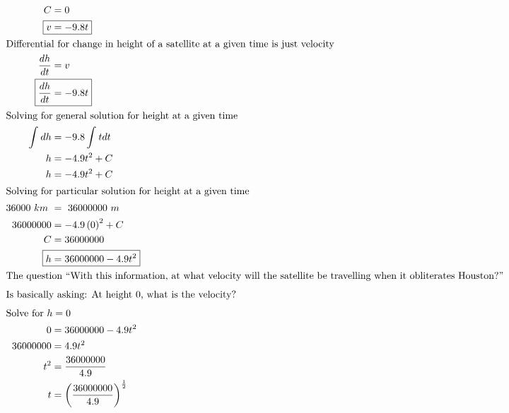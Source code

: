 \documentclass[12pt]{article}
\begin{document}
\begin{align}
  C                       & =0                                                                             \\
  \Aboxed{v               & =-9.8t}                                                                        \\
  \intertext{Differential for change in height of a satellite at a given time is just velocity}
  \frac{dh}{dt}           & =v                                                                             \\
  \Aboxed{\frac{dh}{dt}   & =-9.8t}                                                                        \\
  \intertext{Solving for general solution for height at a given time}
  \int_{ }^{ }dh          & =-9.8\int_{ }^{ }tdt                                                           \\
  h                       & =-4.9t^{2}+C                                                                   \\
  h                       & =-4.9t^{2}+C                                                                   \\
  \intertext{Solving for particular solution for height at a given time}
  36000\ km\              & =\ 36000000\ m                                                                 \\
  36000000                & =-4.9\left(0\right)^{2}+C                                                      \\
  C                       & =36000000                                                                      \\
  \Aboxed{h               & =36000000-4.9t^{2}}                                                            \\
  \intertext{The question ``With this information, at what velocity will the satellite be travelling when it obliterates Houston?''}
  \intertext{Is basically asking: At height 0, what is the velocity?}
  \intertext{Solve for $h=0$}
  0                       & =36000000-4.9t^{2}                                                             \\
  36000000                & =4.9t^{2}                                                                      \\
  t^{2}                   & =\frac{36000000}{4.9}                                                          \\
  t                       & =\left(\frac{36000000}{4.9}\right)^{\frac{1}{2}}                               \\

\end{align}
\end{document}
